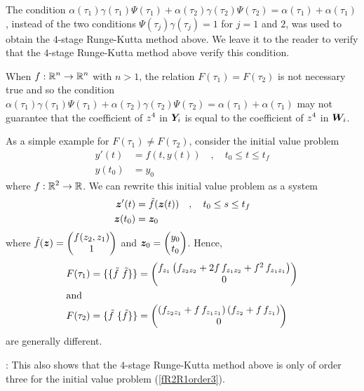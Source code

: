 \begin{rmk}
The condition $\alpha(\tau_1)\gamma(\tau_1)\Psi(\tau_1) +
\alpha(\tau_2)\gamma(\tau_2)\Psi(\tau_2) = \alpha(\tau_1) +
\alpha(\tau_1)$, instead of the two conditions
$\Psi(\tau_j)\gamma(\tau_j) = 1$ for $j=1$ and $2$, was used to
obtain the $4$-stage Runge-Kutta method above.  We leave it to the
reader to verify that the $4$-stage Runge-Kutta method above verify this
condition.

When $\displaystyle f:\mathbb{R}^n \rightarrow \mathbb{R}^n$ with $n>1$, the relation
$F(\tau_1)= F(\tau_2)$ is not necessary true and so the condition
$\alpha(\tau_1)\gamma(\tau_1)\Psi(\tau_1) +
\alpha(\tau_2)\gamma(\tau_2)\Psi(\tau_2) = \alpha(\tau_1) +
\alpha(\tau_1)$ may not guarantee that the coefficient of
$\displaystyle z^4$ in $\bm{Y}_i$ is equal to the coefficient of
$\displaystyle z^4$ in $\bm{W}_i$.

As a simple example for $F(\tau_1) \neq F(\tau_2)$, consider the
initial value problem
\begin{equation} \label{fR2R1order3}
\begin{split}
y'(t) & = f(t,y(t)) \quad , \quad  t_0 \leq t \leq t_f \\
y(t_0) &= y_0
\end{split}
\end{equation}
where $\displaystyle f:\mathbb{R}^2 \rightarrow \mathbb{R}$.   We can rewrite this
initial value problem as a system
\begin{align*}
\bm{z}'(t) & = \tilde{f}(\bm{z}(t)) \quad , \quad  t_0 \leq s \leq t_f \\
\bm{z}(t_0) &= \bm{z}_0
\end{align*}
where
$\displaystyle \tilde{f}(\bm{z}) = \begin{pmatrix}
f(z_2,z_1) \\ 1 \end{pmatrix}$ and
$\displaystyle \bm{z}_0 = \begin{pmatrix}
y_0 \\ t_0 \end{pmatrix}$.
Hence,
\begin{align*}
F(\tau_1) &= \{\{\tilde{f} \ \tilde{f}\}\} =
\begin{pmatrix}
f_{z_1}\left( f_{z_2z_2} + 2f\,f_{z_1z_2} +f^2\,f_{z_1z_1}\right) \\
0
\end{pmatrix} \\
\intertext{and}
F(\tau_2) &= \{\tilde{f}\ \{\tilde{f}\}\} =
\begin{pmatrix}
\left( f_{z_2z_1} + f\,f_{z_1z_1}\right)\left(f_{z_2} +f\,f_{z_1}\right) \\
0
\end{pmatrix}
\end{align*}
are generally different.
\label{NOTiff}

: This also shows that the
$4$-stage Runge-Kutta method above is only of order three for
the initial value problem (\ref{fR2R1order3}).
\end{rmk}

